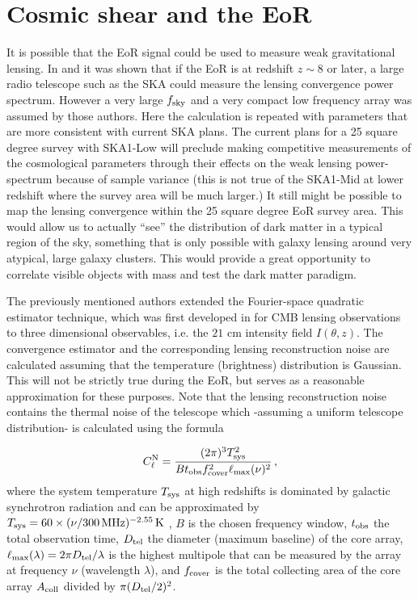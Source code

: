 \documentclass{PoS}
\begin{document}
\section{Cosmic shear and the EoR}
It is possible that the EoR signal could be used to measure weak gravitational lensing.
In \cite{Zahn:2005ap} and \cite{Metcalf:2009}  it was shown that if the EoR is at redshift 
$z \sim 8$ or later, a large radio telescope such as the SKA could measure the lensing convergence power spectrum.  However a very large $f_{\rm sky}$ and a very compact low frequency array was assumed by those authors.  Here the calculation is repeated with parameters that are more consistent with current SKA plans.  The current plans for a 25 square degree survey with SKA1-Low will preclude making competitive measurements of the cosmological parameters through their effects on the weak lensing power-spectrum because of sample variance (this is not true of the SKA1-Mid at lower redshift where the survey area will be much larger.)  It still might be possible to map the lensing convergence within the 25 square degree EoR survey area.  This would allow us to actually ``see'' the distribution of dark matter in a typical region of the sky, something that is only possible with galaxy lensing around very atypical, large galaxy clusters.  This would provide a great opportunity to correlate visible objects with mass and test the dark matter paradigm.

The previously mentioned authors extended the
Fourier-space quadratic estimator technique, which was first developed in 
\cite{Hu:2001tn} for CMB lensing  observations to three dimensional
observables, i.e. the $21$ cm intensity field $I(\theta,z)$.  
The  convergence
estimator and the corresponding lensing reconstruction noise are
calculated assuming that the temperature (brightness) distribution is
Gaussian. This will not be strictly true during the EoR, but serves as a reasonable approximation for these purposes. Note that the lensing reconstruction noise contains the thermal noise of the telescope which -assuming a uniform telescope distribution- is calculated using the formula

\begin{equation}
C^{\rm N}_\ell = \frac{(2\pi)^3 T^2_{\rm sys}}{B t_{\rm obs} f^2_{\rm cover} \ell_{\rm max}(\nu)^2} \, ,
\end{equation} where the system temperature $T_{\rm sys}$ at high redshifts
 is dominated by galactic synchrotron radiation and can be approximated by $T_{\rm sys} = 60 \times (\nu/300 \, {\rm MHz})^{-2.55} \, {\rm K}$ \citep{Dewdney:2013}, $B$ is the chosen frequency window, $t_{\rm obs}$ the total observation time, $D_{\rm tel}$ the diameter (maximum baseline) of the core array, $\ell_{\rm max}(\lambda)=2\pi D_{\rm tel}/\lambda$ is the highest multipole that can be measured by the array at frequency $\nu$ (wavelength $\lambda$), and $f_{\rm cover}$ is the total collecting area of the core array $A_{\rm coll}$ divided by $\pi(D_{\rm tel}/2)^2$. 
 
\end{document}
